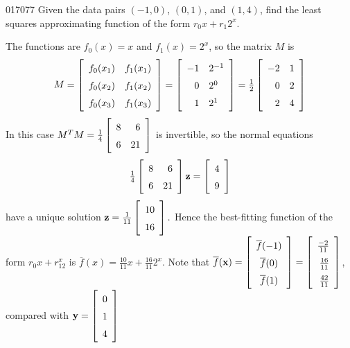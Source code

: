 \begin{example}{}{017077}
Given the data pairs $(-1, 0)$, $(0, 1)$, and $(1, 4)$, find the least squares approximating function of the form $r_{0}x + r_{1}2^{x}$.

\begin{solution}
The functions are $f_{0}(x) = x$ and $f_{1}(x) = 2^{x}$, so the matrix $M$ is
\begin{equation*}
M = \leftB \begin{array}{cc}
f_0(x_1) & f_1(x_1) \\
f_0(x_2) & f_1(x_2) \\
f_0(x_3) & f_1(x_3)
\end{array} \rightB
= \leftB \begin{array}{rl}
-1 & 2^{-1} \\
0 & 2^0 \\
1 & 2^1
\end{array} \rightB
=\frac{1}{2} \leftB \begin{array}{rr}
-2 & 1 \\
0 & 2 \\
2 & 4
\end{array} \rightB
\end{equation*}
In this case $M^TM = \frac{1}{4}
\leftB \begin{array}{rr}
8 & 6 \\
6 & 21
\end{array} \rightB$ is invertible, so the normal equations
\begin{equation*}
\frac{1}{4}
\leftB \begin{array}{rr}
8 & 6 \\
6 & 21
\end{array} \rightB
\vect{z} = 
\leftB \begin{array}{r}
4 \\
9 
\end{array} \rightB
\end{equation*}
have a unique solution $\vect{z} = \frac{1}{11}
\leftB \begin{array}{r}
10 \\
16
\end{array} \rightB.$ Hence the best-fitting function of the form $r_0x + r_12^x$ is $\overline{f}(x) = \frac{10}{11}x + \frac{16}{11}2^x$. Note that $\overline{f}(\vect{x}) =
\leftB \begin{array}{c}
	\overline{f}(-1) \\
	\overline{f}(0) \\
	\overline{f}(1) \\
\end{array} \rightB
= \def\arraystretch{1.5}
\leftB \begin{array}{r}
\frac{-2}{11} \\
\frac{16}{11} \\
\frac{42}{11}
\end{array} \rightB$, compared with $\vect{y} = 
\leftB \begin{array}{r}
0 \\
1 \\
4
\end{array} \rightB$
\end{solution}
\end{example}


